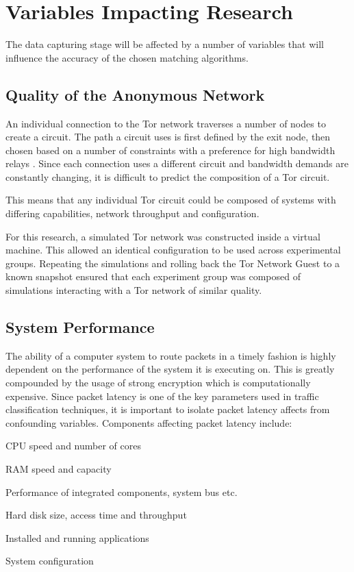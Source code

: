 \documentclass{ecuthesis}
\begin{document}
\section{Variables Impacting Research}

The data capturing stage will be affected by a number of variables that will
influence the accuracy of the chosen matching algorithms.

\subsection{Quality of the Anonymous Network}

An individual connection to the Tor network traverses a number of nodes to
create a circuit. The path a circuit uses is first defined by the exit node,
then chosen based on a number of constraints with a preference for high
bandwidth relays \parencite{website:tor-path-selection}. Since each connection
uses a different circuit and bandwidth demands are constantly changing, it is
difficult to predict the composition of a Tor circuit.

This means that any individual Tor circuit could be composed of systems with
differing capabilities, network throughput and configuration.

For this research, a simulated Tor network was constructed inside a virtual
machine. This allowed an identical configuration to be used across experimental
groups. Repeating the simulations and rolling back the Tor Network Guest to a
known snapshot ensured that each experiment group was composed of simulations
interacting with a Tor network of similar quality.

\subsection{System Performance}

The ability of a computer system to route packets in a timely fashion is highly
dependent on the performance of the system it is executing on. This is greatly
compounded by the usage of strong encryption which is computationally expensive.
Since packet latency is one of the key parameters used in traffic classification
techniques, it is important to isolate packet latency affects from confounding
variables. Components affecting packet latency include:

\begin{itemize*}
  \item CPU speed and number of cores
  \item RAM speed and capacity
  \item Performance of integrated components, system bus etc.
  \item Hard disk size, access time and throughput
  \item Installed and running applications
  \item System configuration
\end{itemize*}
\end{document}
